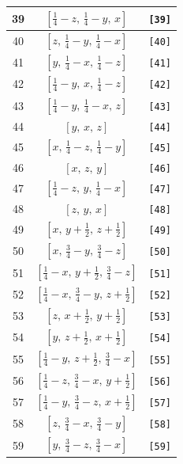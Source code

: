 \documentclass[fleqn,8pt]{jsarticle}
\begin{document}
\begin{longtable}{ccc}
39 & $\left[ \frac{1}{4} - z,\, \frac{1}{4} - y,\, x \right]$ & {\tt [39]} \\ \hline
40 & $\left[ z,\, \frac{1}{4} - y,\, \frac{1}{4} - x \right]$ & {\tt [40]} \\ \hline
41 & $\left[ y,\, \frac{1}{4} - x,\, \frac{1}{4} - z \right]$ & {\tt [41]} \\ \hline
42 & $\left[ \frac{1}{4} - y,\, x,\, \frac{1}{4} - z \right]$ & {\tt [42]} \\ \hline
43 & $\left[ \frac{1}{4} - y,\, \frac{1}{4} - x,\, z \right]$ & {\tt [43]} \\ \hline
44 & $\left[ y,\, x,\, z \right]$ & {\tt [44]} \\ \hline
45 & $\left[ x,\, \frac{1}{4} - z,\, \frac{1}{4} - y \right]$ & {\tt [45]} \\ \hline
46 & $\left[ x,\, z,\, y \right]$ & {\tt [46]} \\ \hline
47 & $\left[ \frac{1}{4} - z,\, y,\, \frac{1}{4} - x \right]$ & {\tt [47]} \\ \hline
48 & $\left[ z,\, y,\, x \right]$ & {\tt [48]} \\ \hline
49 & $\left[ x,\, y + \frac{1}{2},\, z + \frac{1}{2} \right]$ & {\tt [49]} \\ \hline
50 & $\left[ x,\, \frac{3}{4} - y,\, \frac{3}{4} - z \right]$ & {\tt [50]} \\ \hline
51 & $\left[ \frac{1}{4} - x,\, y + \frac{1}{2},\, \frac{3}{4} - z \right]$ & {\tt [51]} \\ \hline
52 & $\left[ \frac{1}{4} - x,\, \frac{3}{4} - y,\, z + \frac{1}{2} \right]$ & {\tt [52]} \\ \hline
53 & $\left[ z,\, x + \frac{1}{2},\, y + \frac{1}{2} \right]$ & {\tt [53]} \\ \hline
54 & $\left[ y,\, z + \frac{1}{2},\, x + \frac{1}{2} \right]$ & {\tt [54]} \\ \hline
55 & $\left[ \frac{1}{4} - y,\, z + \frac{1}{2},\, \frac{3}{4} - x \right]$ & {\tt [55]} \\ \hline
56 & $\left[ \frac{1}{4} - z,\, \frac{3}{4} - x,\, y + \frac{1}{2} \right]$ & {\tt [56]} \\ \hline
57 & $\left[ \frac{1}{4} - y,\, \frac{3}{4} - z,\, x + \frac{1}{2} \right]$ & {\tt [57]} \\ \hline
58 & $\left[ z,\, \frac{3}{4} - x,\, \frac{3}{4} - y \right]$ & {\tt [58]} \\ \hline
59 & $\left[ y,\, \frac{3}{4} - z,\, \frac{3}{4} - x \right]$ & {\tt [59]} \\ \hline

\end{longtable}
\end{document}
